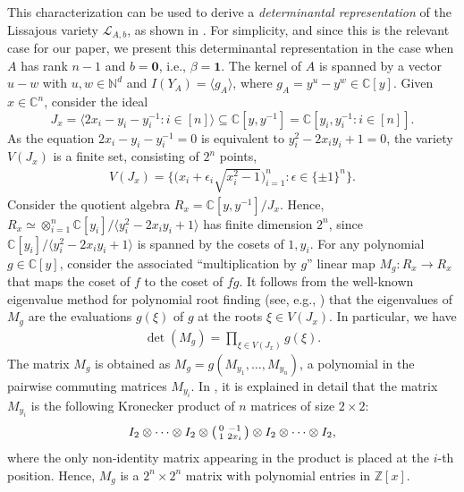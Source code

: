 \documentclass[a4paper, 11pt, twoside]{article}
\newcommand{\C}{\mathbb{C}}
\newcommand{\ML}{{\mathcal L}}
\newcommand{\Z}{\mathbb Z}
\newcommand{\N}{\mathbb N}
\newcommand{\one}{{\mathbf 1}}
\theoremstyle{plain}
\begin{document}
 
This characterization can be used to derive a {\em determinantal representation} of the Lissajous variety $\ML_{A,b}$, as shown in \cite[Theorem 3.1]{mascarin2025lissajousvarieties}. For simplicity, and since this is the relevant case for our paper, we present this determinantal representation in the case when $A$ has rank $n-1$ and $b=\mathbf{0}$, i.e., $\beta=\one$.
The kernel of $A$ is spanned by a  vector $u-w$ with $u,w\in\N^d$ and
$I(Y_A)=\langle g_A\rangle$,   where $g_A=y^u-y^w\in \C[y]$. Given $x\in\C^n$, consider the ideal 
$$J_x=\langle 2x_i-y_i-y_i^{-1}: i\in [n]\rangle\subseteq \C[y,y^{-1}]=\C[y_i,y_i^{-1}: i\in [n]].$$
 As the equation $2x_i-y_i-y_i^{-1}=0$ is equivalent to $y_i^2-2x_iy_i+1=0$,  the variety $V(J_x)$ is a finite set, consisting of  $2^n$ points, 
\begin{align}\label{eq:VJx}
V(J_x)=\Big\{\big(x_i+\epsilon_i \sqrt{x_i^2-1}\big)_{i=1}^n: \epsilon\in \{\pm 1\}^n\Big\}.
\end{align}
Consider the quotient algebra 
$R_x= \C[y,y^{-1}]/J_x$. Hence, $R_x\simeq \otimes_{i=1}^n \C[y_i]/\langle y_i^2-2x_iy_i+1\rangle$ has finite dimension $2^n$, since $\C[y_i]/\langle y_i^2-2x_iy_i+1\rangle$ is spanned by the cosets of  $1,y_i$. 
 For any polynomial $g\in \C[y]$, consider the associated ``multiplication by $g$'' linear map $M_g: R_x \to R_x$ that maps the coset of $f$ to the coset of $fg$.  It follows from the well-known eigenvalue method for polynomial root finding (see, e.g., \cite[Chapter 4, Proposition 2.7]{CoxLittleOShea2005UsingAG})  that the eigenvalues of $M_g$ are the evaluations $g(\xi)$ of $g$ at the roots $\xi\in V(J_x)$. In particular, we have
\begin{align}\label{eq:detg}
\det (M_g)= \prod_{\xi\in V(J_x)} g(\xi).
\end{align}
The matrix $M_g$ is obtained as  $M_g=g(M_{y_1},\ldots,M_{y_n})$, a polynomial in the pairwise commuting matrices $M_{y_i}$. In \cite[Section 3]{mascarin2025lissajousvarieties}, it is explained in detail that the matrix $M_{y_i}$ is the following Kronecker product of $n$ matrices of size $2 \times 2$:
\[  
I_2 \otimes \cdots \otimes I_2\otimes \left ( \begin{smallmatrix} 0 & -1\cr 1 & 2x_i\end{smallmatrix} \right) 
 \otimes I_2\otimes \cdots \otimes I_2,\]  
where the only non-identity matrix appearing in the product is placed at the $i$-th position.  
Hence, $M_g$ is a $2^n\times 2^n$ matrix with polynomial entries in $\Z[x]$.
\end{document}
